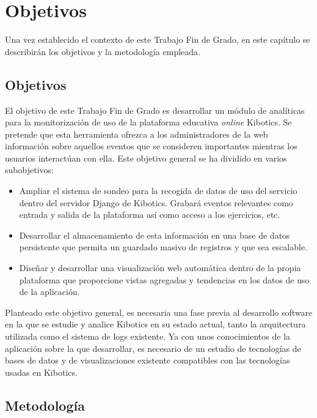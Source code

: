\documentclass[a4paper, 12pt]{book}
\begin{document}
		
		
	\cleardoublepage 
	\chapter{Objetivos} 
	\label{chap:objetivos} 
		Una vez establecido el contexto de este Trabajo Fin de Grado, en este capítulo se describirán los objetivos y la metodología empleada.

	\section{Objetivos}
	\label{sec:objetivos}
		El objetivo de este Trabajo Fin de Grado es desarrollar un módulo de analíticas para la monitorización de uso de la plataforma educativa \textit{online} Kibotics. Se pretende que esta herramienta ofrezca a los administradores de la web información sobre aquellos eventos que se consideren importantes mientras los usuarios interactúan con ella. Este objetivo general se ha dividido en varios subobjetivos:
		
		\begin{itemize}
			\item Ampliar el sistema de sondeo para la recogida de datos de uso del servicio dentro del servidor Django de Kibotics. Grabará eventos relevantes como entrada y salida de la plataforma así como acceso a los ejercicios, etc.
			\item Desarrollar el almacenamiento de esta información en una base de datos persistente que permita un guardado masivo de registros y que sea escalable.
			\item Diseñar y desarrollar una visualización web automática dentro de la propia plataforma que proporcione vistas agregadas y tendencias en los datos de uso de la aplicación.
		\end{itemize}
	
		Planteado este objetivo general, es necesaria una fase previa al desarrollo software en la que se estudie y analice Kibotics en su estado actual, tanto la arquitectura utilizada como el sistema de logs existente. Ya con unos conocimientos de la aplicación sobre la que desarrollar, es necesario de un estudio de tecnologías de bases de datos y de visualizaciones existente compatibles con las tecnologías usadas en Kibotics. \\
			
		
	\section{Metodología}
	\label{sec:metodologia}
				
\end{document}
